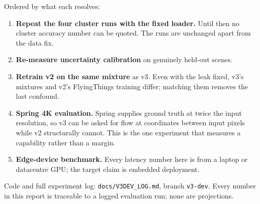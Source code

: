 \documentclass[11pt,a4paper]{article}
\begin{document}
\noindent Ordered by what each resolves:
\begin{enumerate}
  \item \textbf{Repeat the four cluster runs with the fixed loader.} Until
  then no cluster accuracy number can be quoted. The runs are unchanged apart
  from the data fix.
  \item \textbf{Re-measure uncertainty calibration} on genuinely held-out
  scenes.
  \item \textbf{Retrain v2 on the same mixture} as v3. Even with the leak
  fixed, v3's mixtures and v2's FlyingThings training differ; matching them
  removes the last confound.
  \item \textbf{Spring 4K evaluation.} Spring supplies ground truth at twice
  the input resolution, so v3 can be asked for flow at coordinates between
  input pixels while v2 structurally cannot. This is the one experiment that
  measures a capability rather than a margin.
  \item \textbf{Edge-device benchmark.} Every latency number here is from a
  laptop or datacentre GPU; the target claim is embedded deployment.
\end{enumerate}

\vspace{0.4em}
\noindent\small
Code and full experiment log: \texttt{docs/V3DEV\_LOG.md},
branch \texttt{v3-dev}. Every number in this report is traceable to a logged
evaluation run; none are projections.
\end{document}

